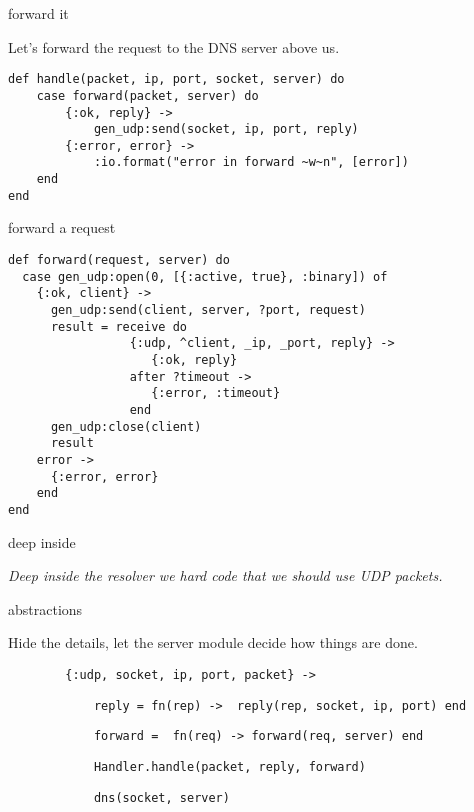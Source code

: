 \begin{frame}[fragile]{forward it}

\pause
Let's forward the request to the DNS server above us.

\pause

\begin{verbatim}
def handle(packet, ip, port, socket, server) do
    case forward(packet, server) do
        {:ok, reply} ->
            gen_udp:send(socket, ip, port, reply)
        {:error, error} ->
            :io.format("error in forward ~w~n", [error])
    end
end
\end{verbatim}

\end{frame}

\begin{frame}[fragile]{forward a request}

\begin{verbatim}
def forward(request, server) do
  case gen_udp:open(0, [{:active, true}, :binary]) of
    {:ok, client} ->
      gen_udp:send(client, server, ?port, request)
      result = receive do
                 {:udp, ^client, _ip, _port, reply} ->
                    {:ok, reply}
                 after ?timeout ->
                    {:error, :timeout}
                 end
      gen_udp:close(client)
      result
    error ->
      {:error, error}
    end
end
\end{verbatim}

\end{frame}


\begin{frame}{deep inside}


\vspace{10pt}\pause
{\em Deep inside the resolver we hard code that we should use UDP packets.}

\end{frame}



\begin{frame}[fragile]{abstractions}

Hide the details, let the server module decide how things are done.

\vspace{10pt}\pause
 
\begin{verbatim}
        {:udp, socket, ip, port, packet} ->
\end{verbatim}\pause
\begin{verbatim}
            reply = fn(rep) ->  reply(rep, socket, ip, port) end
\end{verbatim}\pause
\begin{verbatim}
            forward =  fn(req) -> forward(req, server) end
\end{verbatim}\pause
\begin{verbatim}
            Handler.handle(packet, reply, forward)
\end{verbatim}\pause
\begin{verbatim}
            dns(socket, server)
\end{verbatim}

\end{frame}

